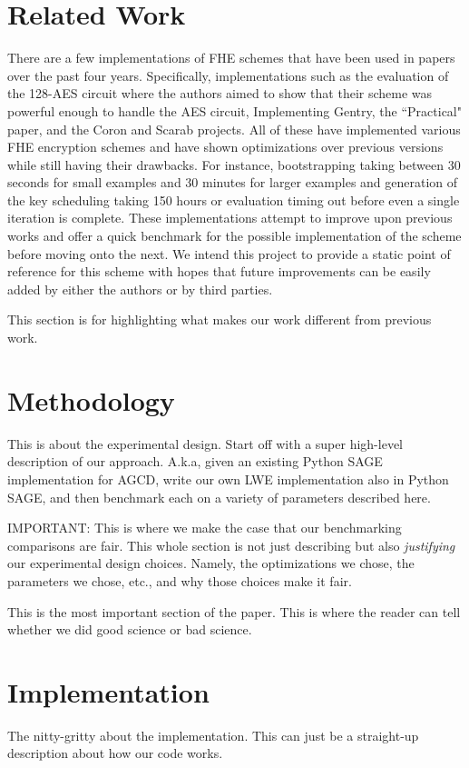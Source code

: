 \documentclass[letterpaper,twocolumn,10pt]{article}
\begin{document}
\section{Related Work}
There are a few implementations of FHE schemes that have been used in papers over the past four years. Specifically, implementations such as the evaluation of the 128-AES circuit\cite{AES} where the authors aimed to show that their scheme was powerful enough to handle the AES circuit, Implementing Gentry\cite{ImplementingGentry}, the ``Practical" paper\cite{Practical}, and the Coron and Scarab projects. All of these have implemented various FHE encryption schemes and have shown optimizations over previous versions while still having their drawbacks. For instance, bootstrapping taking between 30 seconds for small examples and 30 minutes for larger examples\cite{ImplementingGentry} and generation of the key scheduling taking 150 hours or evaluation timing out before even a single iteration is complete\cite{AES}. These implementations attempt to improve upon previous works and offer a quick benchmark for the possible implementation of the scheme before moving onto the next. We intend this project to provide a static point of reference for this scheme with hopes that future improvements can be easily added by either the authors or by third parties.

This section is for highlighting what makes our work different from previous work.


\section{Methodology}
This is about the experimental design. Start off with a super high-level description of our approach. A.k.a, given an existing Python SAGE implementation for AGCD, write our own LWE implementation also in Python SAGE, and then benchmark each on a variety of parameters described here. 

IMPORTANT: This is where we make the case that our benchmarking comparisons are fair. This whole section is not just describing but also \emph{justifying} our experimental design choices. Namely, the optimizations we chose, the parameters we chose, etc., and why those choices make it fair. 

This is the most important section of the paper. This is where the reader can tell whether we did good science or bad science.


\section{Implementation}
The nitty-gritty about the implementation. This can just be a straight-up description about how our code works.
\end{document}
